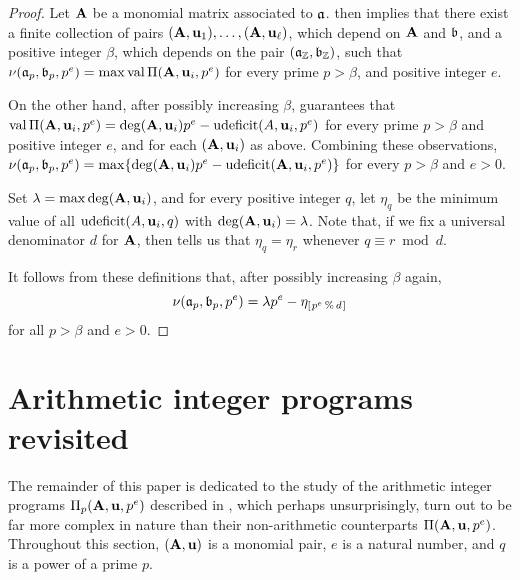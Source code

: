 \documentclass{amsart}
\begin{document}
\begin{proof}  Let $\mathbf{A}$ be a monomial matrix associated to $\mathfrak{a}$.    then implies that there exist a finite collection of pairs $(\mathbf{A}, \mathbf{u}_1), \ldots, (\mathbf{A}, \mathbf{u}_{\ell})$, which depend on $\mathbf{A}$ and $\mathfrak{b}$, and a positive integer $\beta$, which depends on the pair $(\mathfrak{a}_{\mathbb{Z}}, \mathfrak{b}_{\mathbb{Z}})$,  such that $\nu(\mathfrak{a}_p, \mathfrak{b}_p, p^e) = \max \operatorname{val} \Pi(\mathbf{A}, \mathbf{u}_i, p^e)$  for every prime $p > \beta$, and positive integer $e$.  

On the other hand, after possibly increasing $\beta$,  guarantees that 
$\operatorname{val} \Pi(\mathbf{A}, \mathbf{u}_i, p^e) = \deg(\mathbf{A}, \mathbf{u}_i) p^e - \operatorname{udeficit}(A, \mathbf{u}_i, p^e)$  for every prime $p > \beta$ and positive integer $e$, and for each $(\mathbf{A}, \mathbf{u}_i)$ as above.   Combining these observations, 
$\nu(\mathfrak{a}_p, \mathfrak{b}_p, p^e) = \max  \{ \deg(\mathbf{A}, \mathbf{u}_i) p^e - \operatorname{udeficit}(\mathbf{A}, \mathbf{u}_i, p^e) \}$ for every $p > \beta$ and $e > 0$.  

Set $\lambda = \max \deg(\mathbf{A}, \mathbf{u}_i)$, and for every positive integer $q$, let $\eta_{q}$ be the minimum value of all $\operatorname{udeficit}(A, \mathbf{u}_i, q)$ with $ \deg(\mathbf{A}, \mathbf{u}_i) = \lambda$.  Note that, if we fix a universal denominator $d$ for $\mathbf{A}$, then  tells us that $\eta_q = \eta_r$ whenever $q \equiv r \bmod d$.  

It follows from these definitions that, after possibly increasing $\beta$ again, 
\[ \nu(\mathfrak{a}_p, \mathfrak{b}_p, p^e) = \lambda p^e - \eta_{[ \hspace{.01in} p^e \, \% \, d \hspace{.01in} ]} \] 
for all $p > \beta$ and $e > 0$.
\end{proof}

\section{Arithmetic integer programs revisited}

The remainder of this paper is dedicated to the study of the arithmetic integer programs $\Pi_p(\mathbf{A}, \mathbf{u}, p^e)$ described in , which perhaps unsurprisingly, turn out to be far more complex in nature than their non-arithmetic counterparts $\Pi(\mathbf{A}, \mathbf{u}, p^e)$.
Throughout this section, $(\mathbf{A},\mathbf{u})$ is a monomial pair, $e$ is a natural number, and $q$ is a power of a prime $p$.
\end{document}
